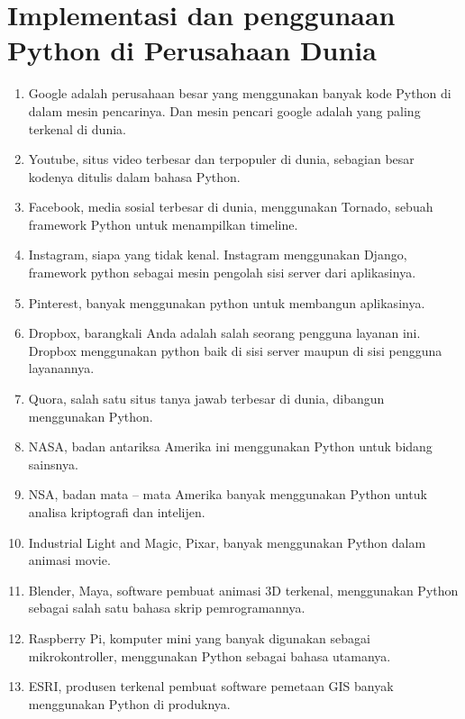 \documentclass[lipt]{Article}
\begin{document}
\section{Implementasi dan penggunaan Python di Perusahaan Dunia}
\begin{enumerate}


\item Google adalah perusahaan besar yang menggunakan banyak kode Python di dalam mesin pencarinya. Dan mesin pencari google adalah yang paling terkenal di dunia.

\item Youtube, situs video terbesar dan terpopuler di dunia, sebagian besar kodenya ditulis dalam bahasa Python.

\item Facebook, media sosial terbesar di dunia, menggunakan Tornado, sebuah framework Python untuk menampilkan timeline.

\item Instagram, siapa yang tidak kenal. Instagram menggunakan Django, framework python sebagai mesin pengolah sisi server dari aplikasinya.

\item Pinterest, banyak menggunakan python untuk membangun aplikasinya.

\item Dropbox, barangkali Anda adalah salah seorang pengguna layanan ini. Dropbox menggunakan python baik di sisi server maupun di sisi pengguna layanannya.

\item Quora, salah satu situs tanya jawab terbesar di dunia, dibangun menggunakan Python.

\item NASA, badan antariksa Amerika ini menggunakan Python untuk bidang sainsnya.

\item NSA, badan mata – mata Amerika banyak menggunakan Python untuk analisa kriptografi dan intelijen.

\item Industrial Light and Magic, Pixar, banyak menggunakan Python dalam animasi movie.

\item Blender, Maya, software pembuat animasi 3D terkenal, menggunakan Python sebagai salah satu bahasa skrip pemrogramannya.

\item Raspberry Pi, komputer mini yang banyak digunakan sebagai mikrokontroller, menggunakan Python sebagai bahasa utamanya.

\item ESRI, produsen terkenal pembuat software pemetaan GIS banyak menggunakan Python di produknya.


\end{enumerate}
\end{document}
